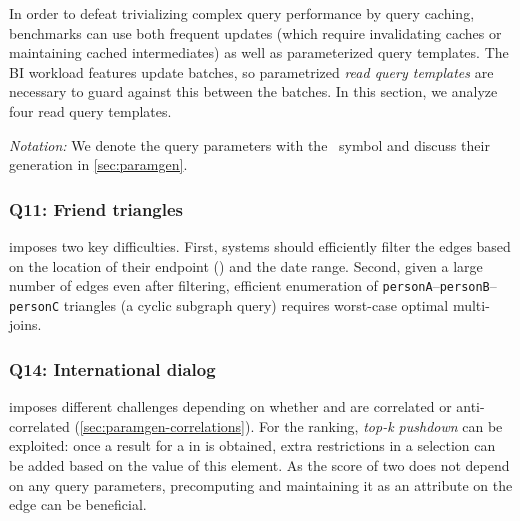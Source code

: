 In order to defeat trivializing complex query performance by query caching, benchmarks can use both frequent updates (which require invalidating caches or maintaining cached intermediates) as well as parameterized query templates.
The BI workload features update batches, so parametrized \emph{read query templates} are necessary to guard against this between the batches.
In this section, we analyze four read query templates.

\emph{Notation:}
We denote the query parameters with the \param{}~symbol and discuss their generation in \autoref{sec:paramgen}.

\subsubsection{Q11: Friend triangles}

 imposes two key difficulties.
First, systems should efficiently filter the \tKnows edges based on the location of their endpoint \tPersons (\tCountry {}) and the date range.
Second, given a large number of \tKnows edges even after filtering,
efficient enumeration of \texttt{personA}--\texttt{personB}--\texttt{personC} triangles (a cyclic subgraph query)
requires worst-case optimal multi-joins.

\subsubsection{Q14: International dialog}

 imposes different challenges depending on whether
\tCountries {} and  are correlated or anti-correlated
(\autoref{sec:paramgen-correlations}).
For the ranking, \emph{top-k pushdown} can be exploited:
once a result for a \tCity in  is obtained,
extra restrictions in a selection can be added based on the value of this element.
As the score of two \tPersons does not depend on any query parameters,
precomputing and maintaining it as an attribute on the \tKnows edge can be beneficial.

